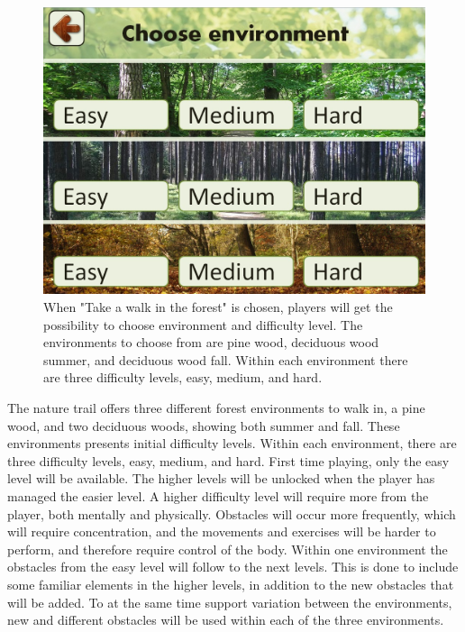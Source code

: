\begin{figure} [H]
\centering
\includegraphics[scale=0.45]{chooseEnvironment.jpg}
\caption[Choice of environment and difficulty level]{When "Take a walk in the forest" is chosen, players will get the possibility to choose environment and difficulty level. The environments to choose from are pine wood, deciduous wood summer, and deciduous wood fall. Within each environment there are three difficulty levels, easy, medium, and hard.}
\label{fig:omgivelseNivaa}
\end{figure}

The nature trail offers three different forest environments to walk in, a pine wood, and two deciduous woods, showing both summer and fall. These environments presents initial difficulty levels. Within each environment, there are three difficulty levels, easy, medium, and hard. First time playing, only the easy level will be available. The higher levels will be unlocked when the player has managed the easier level. A higher difficulty level will require more from the player, both mentally and physically. Obstacles will occur more frequently, which will require concentration, and the movements and exercises will be harder to perform, and therefore require control of the body. Within one environment the obstacles from the easy level will follow to the next levels. This is done to include some familiar elements in the higher levels, in addition to the new obstacles that will be added. To at the same time support variation between the environments, new and different obstacles will be used within each of the three environments.  

